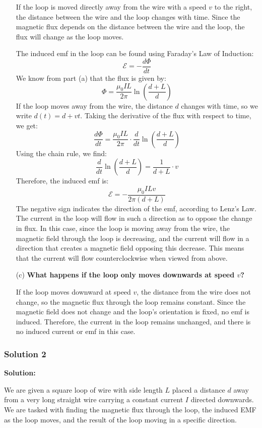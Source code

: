 \documentclass{article}
\begin{document}
\begin{enumerate}
    If the loop is moved directly away from the wire with a speed $v$ to the right, the distance between the wire and the loop changes with time. Since the magnetic flux depends on the distance between the wire and the loop, the flux will change as the loop moves.

    The induced emf in the loop can be found using Faraday's Law of Induction:
    \[
    \mathcal{E} = -\frac{d\Phi}{dt}
    \]
    We know from part (a) that the flux is given by:
    \[
    \Phi = \frac{\mu_0 I L}{2\pi} \ln \left( \frac{d+L}{d} \right)
    \]
    If the loop moves away from the wire, the distance $d$ changes with time, so we write $d(t) = d + vt$. Taking the derivative of the flux with respect to time, we get:
    \[
    \frac{d\Phi}{dt} = \frac{\mu_0 I L}{2\pi} \cdot \frac{d}{dt} \ln \left( \frac{d+L}{d} \right)
    \]
    Using the chain rule, we find:
    \[
    \frac{d}{dt} \ln \left( \frac{d+L}{d} \right) = \frac{1}{d+L} \cdot v
    \]
    Therefore, the induced emf is:
    \[
    \mathcal{E} = -\frac{\mu_0 I L v}{2\pi (d+L)}
    \]
    The negative sign indicates the direction of the emf, according to Lenz's Law. The current in the loop will flow in such a direction as to oppose the change in flux. In this case, since the loop is moving away from the wire, the magnetic field through the loop is decreasing, and the current will flow in a direction that creates a magnetic field opposing this decrease. This means that the current will flow counterclockwise when viewed from above.

    \item[(c)] \textbf{What happens if the loop only moves downwards at speed $v$?}
    
    If the loop moves downward at speed $v$, the distance from the wire does not change, so the magnetic flux through the loop remains constant. Since the magnetic field does not change and the loop's orientation is fixed, no emf is induced. Therefore, the current in the loop remains unchanged, and there is no induced current or emf in this case.
\end{enumerate}



\subsubsection{Solution 2}
\textbf{Solution:}

We are given a square loop of wire with side length $L$ placed a distance $d$ away from a very long straight wire carrying a constant current $I$ directed downwards. We are tasked with finding the magnetic flux through the loop, the induced EMF as the loop moves, and the result of the loop moving in a specific direction.
\end{document}
